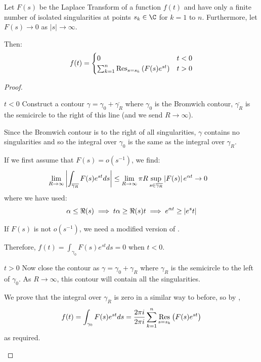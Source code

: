 \documentclass[../Main.tex]{subfiles}
\begin{document}
\begin{proposition}
    Let $F(s)$ be the Laplace Transform of a function $f(t)$ and have only a finite number of isolated singularities at points $s_k \in \C$ for $k = 1$ to $n$.
    Furthermore, let $F(s) \to 0$ as $|s| \to \infty$.

    Then:
    \begin{equation*}
        f(t) =
        \begin{cases}
            0 & t < 0 \\
            \sum_{k=1}^{n} \operatorname*{Res}_{s = s_k} \left(F(s) e^{st}\right) & t > 0
        \end{cases}
    \end{equation*}
    \label{propInverseLaplaceFiniteSings}
\end{proposition}
\begin{proof}
    \begin{case}{$t < 0$}
        Construct a contour $\gamma = \gamma_0 + \overline{\gamma_R}$ where $\gamma_0$ is the Bromwich contour, $\overline{\gamma_R}$ is the semicircle to the right of this line (and we send $R \to \infty$).

        Since the Bromwich contour is to the right of all singularities, $\gamma$ contains no singularities and so the integral over $\gamma_0$ is the same as the integral over $\gamma_R$.

        If we first assume that $F(s) = o(s^{-1})$, we find:
        \begin{align*}
            \lim_{R \to \infty} \left|\int_{\overline{\gamma_R}} F(s) e^{st} ds\right| &\leq \lim_{R \to \infty} \pi R \sup_{s \in \overline{\gamma_R}} \left|F(s)\right| e^{\alpha t} \to 0
        \end{align*}
        where we have used:
        \begin{equation*}
            \alpha \leq \Re(s) \implies t\alpha \geq \Re(s) t \implies e^{\alpha t} \geq \left|e^st\right|
        \end{equation*}

        If $F(s)$ is not $o(s^{-1})$, we need a modified version of .

        Therefore, $f(t) = \int_{\gamma_0} F(s) e^{st} ds = 0$ when $t < 0$.
    \end{case}
    \begin{case}{$t > 0$}
        Now close the contour as $\gamma = \gamma_0 + \gamma_R$ where $\gamma_R$ is the semicircle to the left of $\gamma_0$. As $R \to \infty$, this contour will contain all the singularities.

        We prove that the integral over $\gamma_R$ is zero in a similar way to before, so by ,
        \begin{equation*}
            f(t) = \int_{\gamma_0} F(s) e^{st} ds = \frac{2\pi i}{2\pi i}\sum_{k=1}^{n} \operatorname*{Res}_{s = s_k} \left(F(s) e^{st}\right)
        \end{equation*}
        as required.
    \end{case}
\end{proof}
\end{document}
